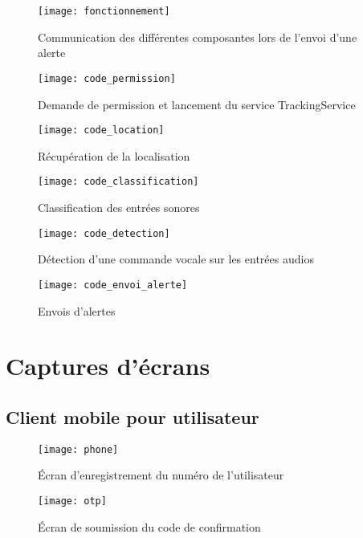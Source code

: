 \begin{figure}[H]
	\centering
	\texttt{[image: fonctionnement]}
	\caption{Communication des différentes composantes lors de l’envoi d’une alerte}
\end{figure}

\begin{figure}[H]
	\centering
	\texttt{[image: code\_permission]}
	\caption{Demande de permission et lancement du service TrackingService}
\end{figure}

\begin{figure}[H]
	\centering
	\texttt{[image: code\_location]}
	\caption{Récupération de la localisation}
\end{figure}

\begin{figure}[H]
	\centering
	\texttt{[image: code\_classification]}
	\caption{Classification des entrées sonores}
\end{figure}

\begin{figure}[H]
	\centering
	\texttt{[image: code\_detection]}
	\caption{Détection d’une commande vocale sur les entrées audios}
\end{figure}

\begin{figure}[H]
	\centering
	\texttt{[image: code\_envoi\_alerte]}
	\caption{Envois d’alertes}
\end{figure}

\section{Captures d’écrans}
\subsection{Client mobile pour utilisateur}

\begin{figure}[H]
	\centering
	\texttt{[image: phone]}
	\caption{Écran d’enregistrement du numéro de l’utilisateur}
\end{figure}

\begin{figure}[H]
	\centering
	\texttt{[image: otp]}
	\caption{Écran de soumission du code de confirmation}
\end{figure}

